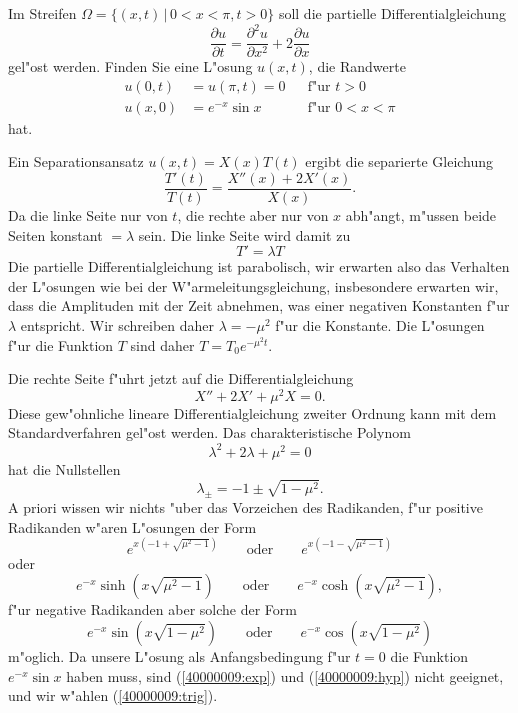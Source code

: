 Im Streifen $\Omega=\{ (x,t)\, |\, 0<x<\pi, t > 0\}$ soll die partielle
Differentialgleichung
\[
\frac{\partial u}{\partial t}
=
\frac{\partial^2 u}{\partial x^2}+2\frac{\partial u}{\partial x}
\]
gel"ost werden. Finden Sie eine L"osung $u(x,t)$, die Randwerte
\begin{align*}
u(0,t)&=u(\pi,t)=0&&\text{f"ur $t>0$}\\
u(x,0)&=e^{-x}\sin x&&\text{f"ur $0<x<\pi$}
\end{align*}
hat.

\begin{loesung}
Ein Separationsansatz $u(x,t)=X(x)T(t)$ ergibt die separierte Gleichung
\[
\frac{T'(t)}{T(t)}
=
\frac{X''(x)+2X'(x)}{X(x)}.
\]
Da die linke Seite nur von $t$, die rechte aber nur von $x$ abh"angt,
m"ussen beide Seiten konstant $=\lambda$ sein. Die linke Seite wird
damit zu
\[
T' = \lambda T
\]
Die partielle Differentialgleichung ist parabolisch, wir erwarten also
das Verhalten der L"osungen wie bei der W"armeleitungsgleichung, insbesondere
erwarten wir, dass die Amplituden mit der Zeit abnehmen, was einer
negativen Konstanten f"ur $\lambda$ entspricht. Wir schreiben daher
$\lambda=-\mu^2$ f"ur die Konstante.
Die L"osungen f"ur die Funktion $T$ sind daher $T=T_0e^{-\mu^2t}$.

Die rechte Seite f"uhrt jetzt auf die Differentialgleichung
\[
X''+2X'+\mu^2X=0.
\]
Diese gew"ohnliche lineare Differentialgleichung zweiter Ordnung
kann mit dem Standardverfahren gel"ost werden. Das charakteristische
Polynom 
\[
\lambda^2+2\lambda +\mu^2=0
\]
hat die Nullstellen
\[
\lambda_{\pm}=-1\pm\sqrt{1-\mu^2}.
\]
A priori wissen wir nichts "uber das Vorzeichen des Radikanden,
f"ur positive Radikanden w"aren L"osungen der Form
\begin{equation}
e^{x(-1+ \sqrt{\mu^2-1})}
\qquad
\text{oder}
\qquad
e^{x(-1-\sqrt{\mu^2-1})}
\label{40000009:exp}
\end{equation}
oder
\begin{equation}
e^{-x}\sinh(x\sqrt{\mu^2-1})
\qquad
\text{oder}
\qquad
e^{-x}\cosh(x\sqrt{\mu^2-1}),
\label{40000009:hyp}
\end{equation}
f"ur negative Radikanden aber solche der Form
\begin{equation}
e^{-x}\sin(x\sqrt{1-\mu^2})
\qquad
\text{oder}
\qquad
e^{-x}\cos(x\sqrt{1-\mu^2})
\label{40000009:trig}
\end{equation}
m"oglich. Da unsere L"osung als Anfangsbedingung f"ur $t=0$ die
Funktion $e^{-x}\sin x$ haben muss, sind (\ref{40000009:exp}) 
und (\ref{40000009:hyp}) nicht geeignet, und wir
w"ahlen (\ref{40000009:trig}).


\end{loesung}
